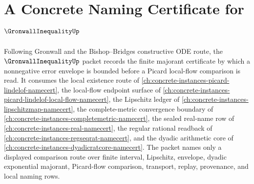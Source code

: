 \chapter{A Concrete Naming Certificate for $\GronwallInequalityUp$}
\label{ch:concrete-instances-gronwall-inequality-namecert}

Following Gronwall and the Bishop--Bridges constructive ODE route, the $\GronwallInequalityUp$ packet records the finite majorant certificate by which a nonnegative error envelope is bounded before a Picard local-flow comparison is read. It consumes the local existence route of \autoref{ch:concrete-instances-picard-lindelof-namecert}, the local-flow endpoint surface of \autoref{ch:concrete-instances-picard-lindelof-local-flow-namecert}, the Lipschitz ledger of \autoref{ch:concrete-instances-lipschitzmap-namecert}, the complete-metric convergence boundary of \autoref{ch:concrete-instances-completemetric-namecert}, the sealed real-name row of \autoref{ch:concrete-instances-real-namecert}, the regular rational readback of \autoref{ch:concrete-instances-regseqrat-namecert}, and the dyadic arithmetic core of \autoref{ch:concrete-instances-dyadicratcore-namecert}. The packet names only a displayed comparison route over finite interval, Lipschitz, envelope, dyadic exponential majorant, Picard-flow comparison, transport, replay, provenance, and local naming rows.

